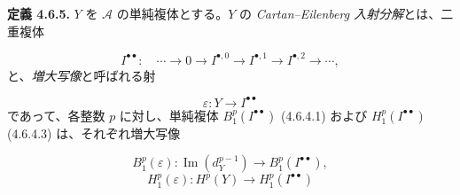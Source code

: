 \medskip\noindent\textbf{定義 4.6.5.}\quad
$Y$ を $\mathcal A$ の単純複体とする。$Y$ の
\emph{Cartan--Eilenberg 入射分解}とは、二重複体

\[
I^{\bullet\bullet}\colon\quad
\cdots\longrightarrow0\longrightarrow I^{\bullet,0}
\longrightarrow I^{\bullet,1}\longrightarrow I^{\bullet,2}
\longrightarrow\cdots,
\]
と、\emph{増大写像}と呼ばれる射

\[
\varepsilon\colon Y\longrightarrow I^{\bullet\bullet}
\]
であって、各整数 $p$ に対し、単純複体
$B_1^p(I^{\bullet\bullet})$ (4.6.4.1) および
$H_1^p(I^{\bullet\bullet})$ (4.6.4.3) は、それぞれ増大写像

\[
B_1^p(\varepsilon)\colon
\operatorname{Im}(d_Y^{p-1})\longrightarrow B_1^p(I^{\bullet\bullet}),
\]
\[
H_1^p(\varepsilon)\colon
H^p(Y)\longrightarrow H_1^p(I^{\bullet\bullet})
\]
\endgroup
